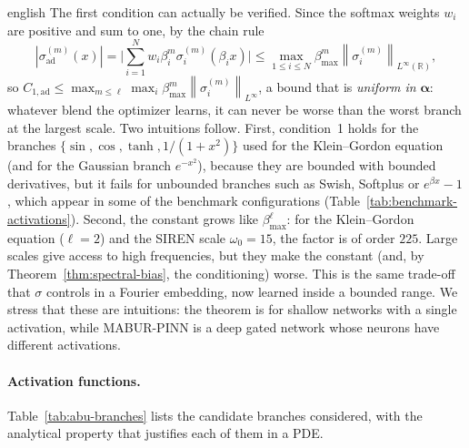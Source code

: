\documentclass[11pt,letterpaper,twoside,openright]{book} %
\newcommand{\norm}[1]{\left\lVert #1 \right\rVert}
\newcommand{\abs}[1]{\left\lvert #1 \right\rvert}
\begin{document}
\begin{hyphenrules}{english}
The first condition can actually be verified. Since the softmax weights $w_i$ are positive and sum to one,
by the chain rule
\begin{equation}
  \abs{\sigma^{(m)}_{\mathrm{ad}}(x)}=\Big|\sum_{i=1}^{N}w_i\beta_i^{m}\sigma_i^{(m)}(\beta_ix)\Big|
  \le\max_{1\le i\le N}\beta_{\max}^{m}\norm{\sigma_i^{(m)}}_{L^\infty(\mathbb{R})},
  \label{eq:abu-bound}
\end{equation}
so $C_{1,\mathrm{ad}}\le\max_{m\le\ell}\max_i\beta_{\max}^{m}\norm{\sigma_i^{(m)}}_{L^\infty}$, a bound that is
\emph{uniform in} $\bm\alpha$: whatever blend the optimizer learns, it can never be worse than the worst
branch at the largest scale. Two intuitions follow. First, condition~1 holds for the branches
$\{\sin,\cos,\tanh,1/(1+x^2)\}$ used for the Klein--Gordon equation (and for the Gaussian branch
$e^{-x^2}$), because they are bounded with bounded derivatives, but it fails for unbounded branches such as
Swish, Softplus or $e^{\beta x}-1$, which appear in some of the benchmark configurations
(Table~\ref{tab:benchmark-activations}). Second, the constant grows like $\beta_{\max}^{\ell}$: for the
Klein--Gordon equation ($\ell=2$) and the SIREN scale $\omega_0=15$, the factor is of order $225$. Large
scales give access to high frequencies, but they make the constant (and, by Theorem~\ref{thm:spectral-bias}, the
conditioning) worse. This is the same trade-off that $\sigma$ controls in a Fourier embedding, now learned
inside a bounded range. We stress that these are intuitions: the theorem is for shallow networks with a
single activation, while MABUR-PINN is a deep gated network whose neurons have different activations.

\paragraph{Activation functions.}
Table~\ref{tab:abu-branches} lists the candidate branches considered, with the analytical property that
justifies each of them in a PDE.


\end{hyphenrules}
\end{document}
